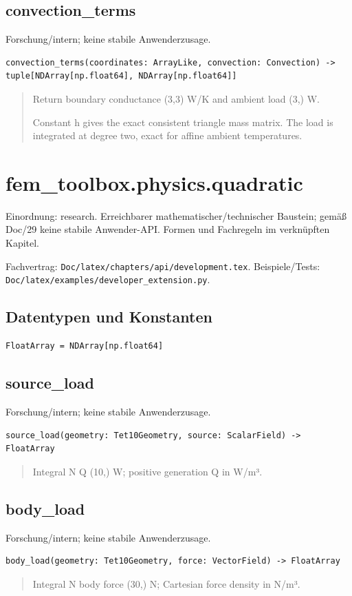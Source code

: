 \subsection{convection\_terms}
Forschung/intern; keine stabile Anwenderzusage.
\begin{lstlisting}
convection_terms(coordinates: ArrayLike, convection: Convection) -> tuple[NDArray[np.float64], NDArray[np.float64]]
\end{lstlisting}
\begin{quote}
Return boundary conductance (3,3) W/K and ambient load (3,) W.\par Constant h gives the exact consistent triangle mass matrix. The load is integrated at degree two, exact for affine ambient temperatures.
\end{quote}
\section{fem\_toolbox.physics.quadratic}
Einordnung: research. Erreichbarer mathematischer/technischer Baustein; gemäß Doc/29 keine stabile Anwender-API. Formen und Fachregeln im verknüpften Kapitel.
\par Fachvertrag: \nolinkurl{Doc/latex/chapters/api/development.tex}. Beispiele/Tests:
\nolinkurl{Doc/latex/examples/developer_extension.py}.
\subsection*{Datentypen und Konstanten}
\begin{lstlisting}
FloatArray = NDArray[np.float64]
\end{lstlisting}
\subsection{source\_load}
Forschung/intern; keine stabile Anwenderzusage.
\begin{lstlisting}
source_load(geometry: Tet10Geometry, source: ScalarField) -> FloatArray
\end{lstlisting}
\begin{quote}
Integral N Q (10,) W; positive generation Q in W/m³.
\end{quote}
\subsection{body\_load}
Forschung/intern; keine stabile Anwenderzusage.
\begin{lstlisting}
body_load(geometry: Tet10Geometry, force: VectorField) -> FloatArray
\end{lstlisting}
\begin{quote}
Integral N body force (30,) N; Cartesian force density in N/m³.
\end{quote}
